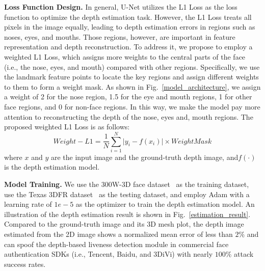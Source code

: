 \textbf{Loss Function Design.} In general, U-Net utilizes the L1 Loss as the loss function to optimize the depth estimation task. However, the L1 Loss treats all pixels in the image equally, leading to depth estimation errors in  regions such as  noses, eyes, and mouths. Those regions, however, are important in feature representation and depth reconstruction.  To address it, we propose to employ a weighted L1 Loss, which assigns more weights to the central parts of the face (i.e., the nose, eyes, and mouth) compared with other regions. Specifically,  we use the landmark feature points to locate the key regions and assign different weights to them to form a weight mask. As shown in Fig.~\ref{model_architecture},  we assign a weight of  2 for the nose region, 1.5 for the eye and mouth regions, 1 for other face regions, and 0 for non-face regions. In this way, we make the model pay more attention to reconstructing the depth of the nose, eyes and, mouth regions. 
The proposed weighted L1 Loss is as follows:
\begin{equation}
	Weight{-}L1=\frac{1}{N}\sum_{i=1}^{N} \lvert y_i - f(x_i) \rvert \times WeightMask
	\label{weigted_loss}
\end{equation}
where $x$ and $y$ are the input image and the ground-truth depth image,  and$f(\cdot)$ is the depth estimation model.

\textbf{Model Training.}
We use the 300W-3D face dataset~\cite{zhu2016face} as the training dataset, use the Texas 3DFR dataset~\cite{gupta2010anthropometric, gupta2010texas} as the testing dataset, and employ Adam with a learning rate of $1e{-}5$  as the optimizer to train the depth estimation model.  An illustration of the depth estimation result is shown in Fig.~\ref{estimation_result}. Compared to the ground-truth image and its 3D mesh plot, the depth image estimated from the 2D image shows a normalized mean error of less than $2\%$ and can spoof the depth-based liveness detection module in commercial face authentication SDKs (i.e., Tencent, Baidu, and 3DiVi) with nearly $100\%$ attack success rates.



